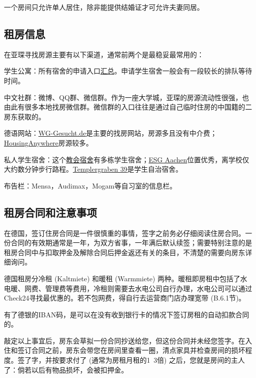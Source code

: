     一个房间只允许单人居住，除非能提供结婚证才可允许夫妻同居。

  \subsection{租房信息}\label{subsec:租房信息}

    在亚琛寻找房源主要有以下渠道，通常前两个是最稳妥最常用的：

    \textbullet 学生公寓：所有宿舍的申请入口\href{https://bewerberportal.stw.rwth-aachen.de/app.php/de/}{汇总}。申请学生宿舍一般会有一段较长的排队等待时间。

    \textbullet 中文社群：微博、QQ群、微信群。作为一座大学城，亚琛的房源流动性很强，也由此有很多本地找房微信群。微信群的入口往往是通过自己临时住房的中国籍的二房东获取的。

    \textbullet 德语网站：\href{http://www.wg-gesucht.de}{WG-Gesucht.de}是主要的找房网站，房源多且没有中介费；\href{http://www.studenten-wg.de}{HousingAnywhere}房源较多。

    \textbullet 私人学生宿舍：这个\href{http://www.stwkhg.de/}{教会宿舍}有多栋学生宿舍；\href{http://www.esg.rwth-aachen.de}{ESG Aachen}位置优秀，离学校仅大约数分钟步行路程。\href{http://www.t39.rwth-aachen.de/}{Templergraben 39}是学生自治宿舍。

    \textbullet 布告栏：Mensa，Audimax，Mogam等自习室的信息栏。

  \subsection{租房合同和注意事项}

    在德国，签订住房合同是一件很慎重的事情，签字之前务必仔细阅读住房合同。一份合同的有效期通常是一年，为双方省事，一年满后默认续签；需要特别注意的是租房合同中与扣取押金及解除合同后押金返还有关的条目，不清楚的需要向房东详细询问。

    德国租房分冷租 (Kaltmiete) 和暖租 (Warmmiete) 两种。暖租即房租中包括了水电暖、网费、管理费等费用，冷租则需要去水电公司自行办理，水电公司可以通过Check24寻找最优惠的。若不包网费，得自行去运营商门店办理宽带 (B.6.1节)。

    有了德银的IBAN码，是可以在没有收到银行卡的情况下签订房租的自动扣款合同的。

    敲定以上事宜后，房东会草拟一份合同抄送给您，但这份合同并未经您签字。在入住和签订合同之前，房东会带您在房间里查看一圈，清点家具并检查房间的损坏程度。签了字，并按要求付了 (通常为房租月租的1~3倍) 之后，您就是房间的主人了：倘若以后有物品损坏，会被扣押金。

